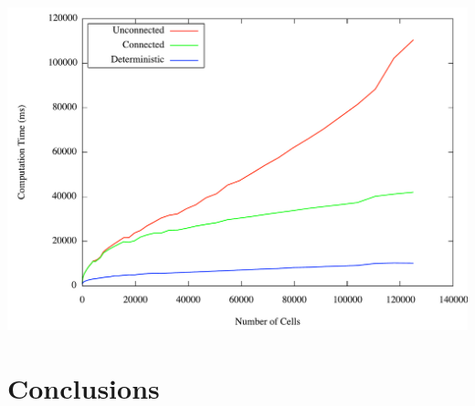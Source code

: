 \documentclass[color={usenames, dvipsnames},ignorenonframetext]{beamer}
\begin{document}
\begin{frame}
    \includegraphics[width=\textwidth, keepaspectratio]{MeshComparison}
\end{frame}
\section{Conclusions}
\end{document}
